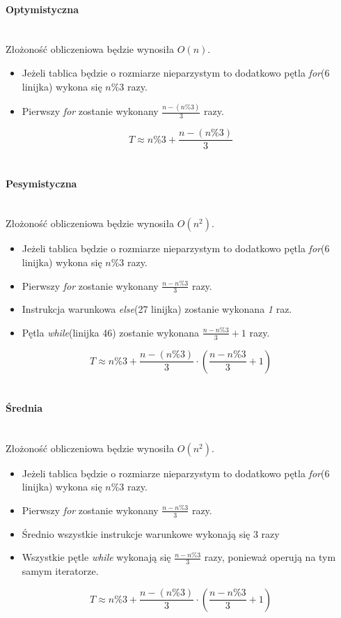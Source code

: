 \paragraph{Optymistyczna}\mbox{}\\

Złożoność obliczeniowa będzie wynosiła $O(n)$.

\begin{itemize}
\item Jeżeli tablica będzie o rozmiarze nieparzystym to dodatkowo pętla \textit{for}(6 linijka) wykona się $n\%3$ razy.
\item Pierwszy \textit{for} zostanie wykonany $\frac{n-(n\%3)}{3} $ razy.
\end{itemize}
\begin{equation*}
T \approx n\%3+\frac{n-(n\%3)}{3}
\end{equation*}
\wyjT\\
\paragraph{Pesymistyczna}\mbox{}\\
Złożoność obliczeniowa będzie wynosiła $O(n^2)$.

\begin{itemize}

\item Jeżeli tablica będzie o rozmiarze nieparzystym to dodatkowo pętla \textit{for}(6 linijka) wykona się $n\%3$ razy.
\item Pierwszy \textit{for} zostanie wykonany $\frac{n-n\%3}{3}$ razy.
\item Instrukcja warunkowa \textit{else}(27 linijka) zostanie wykonana \textit{1} raz.
\item Pętla \textit{while}(linijka 46) zostanie wykonana $\frac{n-n\%3}{3} +1$  razy.
\end{itemize}
\begin{equation*}
T \approx n\%3 + \frac{n-(n\%3)}{3} \cdot(\frac{n-n\%3}{3} +1)
\end{equation*}
\wyjT\\


\paragraph{Średnia}\mbox{}\\
Złożoność obliczeniowa będzie wynosiła $O(n^2)$.
\begin{itemize}

\item Jeżeli tablica będzie o rozmiarze nieparzystym to dodatkowo pętla \textit{for}(6 linijka) wykona się $n\%3$ razy.
\item Pierwszy \textit{for} zostanie wykonany $\frac{n-n\%3}{3}$ razy.
\item Średnio wszystkie instrukcje warunkowe wykonają się $3$ razy
\item Wszystkie pętle \textit{while} wykonają się $\frac{n-n\%3}{3}$ razy, ponieważ operują na tym samym iteratorze.
\end{itemize}
\begin{equation*}
T \approx n\%3 + \frac{n-(n\%3)}{3} \cdot(\frac{n-n\%3}{3} +1)
\end{equation*}
\wyjT\\
